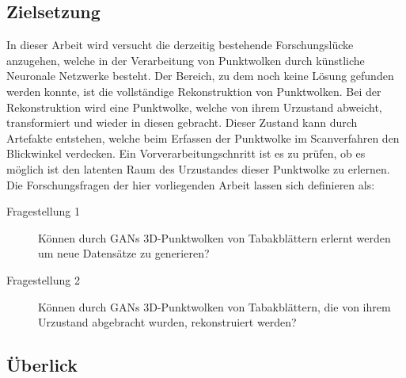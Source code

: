 \documentclass{llncs}
\begin{document}
\subsection{Zielsetzung}\label{ref:objective}
In dieser Arbeit wird versucht die derzeitig bestehende Forschungslücke anzugehen, welche in der Verarbeitung von Punktwolken durch künstliche Neuronale Netzwerke besteht. Der Bereich, zu dem noch keine Lösung gefunden werden konnte, ist die vollständige Rekonstruktion von Punktwolken. Bei der Rekonstruktion wird eine Punktwolke, welche von ihrem Urzustand abweicht, transformiert und wieder in diesen gebracht. Dieser Zustand kann durch Artefakte entstehen, welche beim Erfassen der Punktwolke im Scanverfahren den Blickwinkel verdecken. Ein Vorverarbeitungschnritt ist es zu prüfen, ob es möglich ist den latenten Raum des Urzustandes dieser Punktwolke zu erlernen. Die Forschungsfragen der hier vorliegenden Arbeit lassen sich definieren als:\\
\begin{description}
	\item[Fragestellung 1]
	Können durch GANs 3D-Punktwolken von Tabakblättern erlernt werden um neue Datensätze zu generieren?\\
	
	\item[Fragestellung 2] Können durch GANs 3D-Punktwolken von Tabakblättern, die von ihrem Urzustand abgebracht wurden, rekonstruiert werden? 
\end{description}
\subsection{Überlick}
\end{document}
